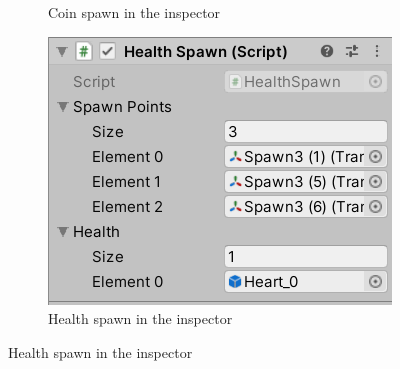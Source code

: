 \begin{figure}[h]
\begin{subfigure}{.5\textwidth}
  \caption{Coin spawn in the inspector}
  \label{fig:CoinSpawnInspect}
  \end{subfigure}
  \begin{subfigure}{.5\textwidth}
\centering
  \includegraphics[width = 1\linewidth]{Images/HealthSpawnInspector.PNG}
  \caption{Health spawn in the inspector}
  \label{fig:HealthSpawnInspect}
    \end{subfigure}
  \end{figure}
  
  


